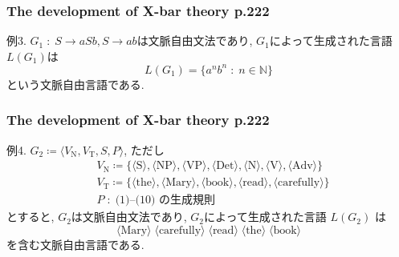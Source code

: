 \documentclass[dvipdfmx, xcolor={dvipsnames},12pt]{beamer}
\newcommand{\N}{\mathbb{N}}%
\begin{document}
\begin{frame}
\frametitle{The development of X-bar theory p.222}
\vspace{-10pt}
\begin{Ex}{例3.}
$G_1\; \colon\; S\to aSb, S\to ab$は文脈自由文法であり, $G_1$によって生成された言語$L(G_1)$は
\[
L(G_1)=\{a^{n}b^{n}\;\colon\; n\in\N\}
\]
という文脈自由言語である.
\end{Ex}




\end{frame}

\begin{frame}
\frametitle{The development of X-bar theory p.222}
\vspace{-5pt}
\begin{Ex}{例4.}
$G_2\coloneq \langle V_\text{N}, V_\text{T}, S, P\rangle$, ただし
\begin{align*}
&V_\text{N}\coloneq \{\langle\text{S}\rangle, \langle\text{NP}\rangle, \langle\text{VP}\rangle, 
\langle\text{Det}\rangle, \langle\text{N}\rangle, \langle\text{V}\rangle, \langle\text{Adv}\rangle\}\\
&V_\text{T}\coloneq \{\langle\text{the}\rangle, \langle\text{Mary}\rangle, 
\langle\text{book}\rangle, \langle\text{read}\rangle, \langle\text{carefully}\rangle\}\\
&P\;\colon\; \text{(1)--(10) の生成規則}
\end{align*}
とすると, $G_2$は文脈自由文法であり, $G_2$によって生成された言語 $L(G_2)$ は
\[
\langle\text{Mary}\rangle\;
\langle\text{carefully}\rangle\;
\langle\text{read}\rangle\;
\langle\text{the}\rangle\;
\langle\text{book}\rangle
\]
を含む文脈自由言語である.
\end{Ex}
\end{frame}
\end{document}

